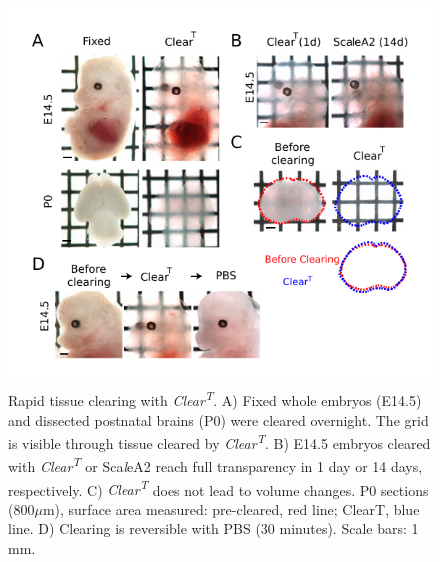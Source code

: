 \begin{figure}[hbtp]
    \begin{center}
        \includegraphics{Figures/ClearT_Fig1}
        \caption[Rapid tissue clearing with \emph{Clear\textsuperscript{T}}.]
        {Rapid tissue clearing with \emph{Clear\textsuperscript{T}}.
		A) Fixed whole embryos (E14.5) and dissected postnatal brains (P0) were cleared overnight.
		The grid is visible through tissue cleared by \emph{Clear\textsuperscript{T}}.
		B) E14.5 embryos cleared with \emph{Clear\textsuperscript{T}} or Sca\emph{l}eA2 reach full transparency in 1 day or 14 days,
		respectively.
		C) \emph{Clear\textsuperscript{T}} does not lead to volume changes.
		P0 sections (800$\mu$m), surface area measured: pre-cleared, red line; ClearT, blue line.
		D) Clearing is reversible with PBS (30 minutes).
		Scale bars: 1 mm.
		}
        \label{ClearT_Fig1}
    \end{center}
\end{figure}

